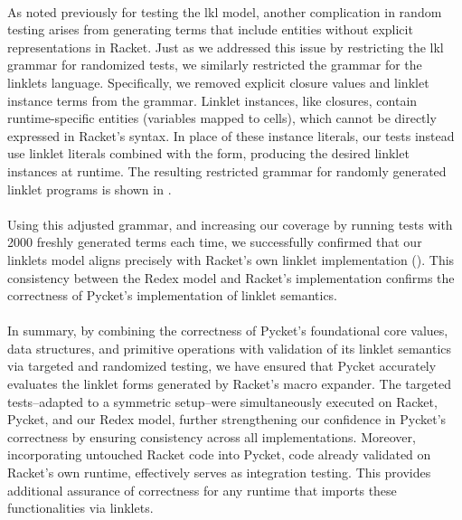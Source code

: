 			\paragraph{}%
				As noted previously for testing the \gls{lkl} model, another complication in random testing arises from generating terms that include entities without explicit representations in Racket. Just as we addressed this issue by restricting the \gls{lkl} grammar for randomized tests, we similarly restricted the grammar for the linklets language. Specifically, we removed explicit closure values and linklet instance terms from the grammar. Linklet instances, like closures, contain runtime-specific entities (variables mapped to cells), which cannot be directly expressed in Racket's syntax. In place of these instance literals, our tests instead use linklet literals combined with the  form, producing the desired linklet instances at runtime. The resulting restricted grammar for randomly generated linklet programs is shown in .


			\paragraph{}%
				Using this adjusted grammar, and increasing our coverage by running tests with 2000 freshly generated terms each time, we successfully confirmed that our linklets model aligns precisely with Racket's own linklet implementation (). This consistency between the Redex model and Racket’s implementation confirms the correctness of Pycket’s implementation of linklet semantics.

			\paragraph{}%
				In summary, by combining the correctness of Pycket's foundational core values, data structures, and primitive operations with validation of its linklet semantics via targeted and randomized testing, we have ensured that Pycket accurately evaluates the linklet forms generated by Racket’s macro expander. The targeted tests--adapted to a symmetric setup--were simultaneously executed on Racket, Pycket, and our Redex model, further strengthening our confidence in Pycket's correctness by ensuring consistency across all implementations. Moreover, incorporating untouched Racket code into Pycket, code already validated on Racket’s own runtime, effectively serves as integration testing. This provides additional assurance of correctness for any runtime that imports these functionalities via linklets.

